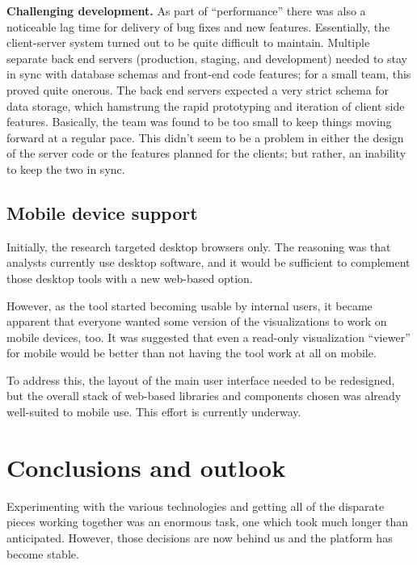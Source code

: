 \textbf{Challenging development.} As part of ``performance'' there was also a noticeable lag time for delivery of bug fixes and new features. Essentially, the client-server system turned out to be quite difficult to maintain. Multiple separate back end servers (production, staging, and development) needed to stay in sync with database schemas and front-end code features; for a small team, this proved quite onerous. The back end servers expected a very strict schema for data storage, which hamstrung the rapid prototyping and iteration of client side features. Basically, the team was found to be too small to keep things moving forward at a regular pace. This didn't seem to be a problem in either the design of the server code or the features planned for the clients; but rather, an inability to keep the two in sync.

\hypertarget{mathub-mobile-device-support}{%
\subsection{Mobile device support}\label{mobile-device-support}}

Initially, the research targeted desktop browsers only. The reasoning was that analysts currently use desktop software, and it would be sufficient to complement those desktop tools with a new web-based option.

However, as the tool started becoming usable by internal users, it became apparent that everyone wanted some version of the visualizations to work on mobile devices, too. It was suggested that even a read-only visualization ``viewer'' for mobile would be better than not having the tool work at all on mobile.

To address this, the layout of the main user interface needed to be redesigned, but the overall stack of web-based libraries and components chosen was already well-suited to mobile use. This effort is currently underway.

\hypertarget{mathub-conclusions-and-outlook}{%
\section{Conclusions and outlook}\label{conclusions-and-outlook}}

Experimenting with the various technologies and getting all of the disparate pieces working together was an enormous task, one which took much longer than anticipated. However, those decisions are now behind us and the platform has become stable.

